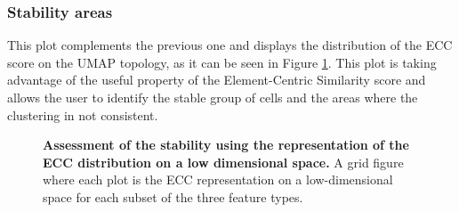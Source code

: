 \subsubsection{Stability areas}
This plot complements the previous one and displays the distribution of the ECC score on the UMAP topology, as it can be seen in Figure \ref{fig:ca-feat-stab}. This plot is taking advantage of the useful property of the Element-Centric Similarity score and allows the user to identify the stable group of cells and the areas where the clustering in not consistent.

\begin{figure}[H]
    \centering
    \caption{\label{fig:ca-feat-stab}\textbf{Assessment of the stability using the representation of the ECC distribution on a low dimensional space.} A grid figure where each plot is the ECC representation on a low-dimensional space for each subset of the three feature types.}
\end{figure}

